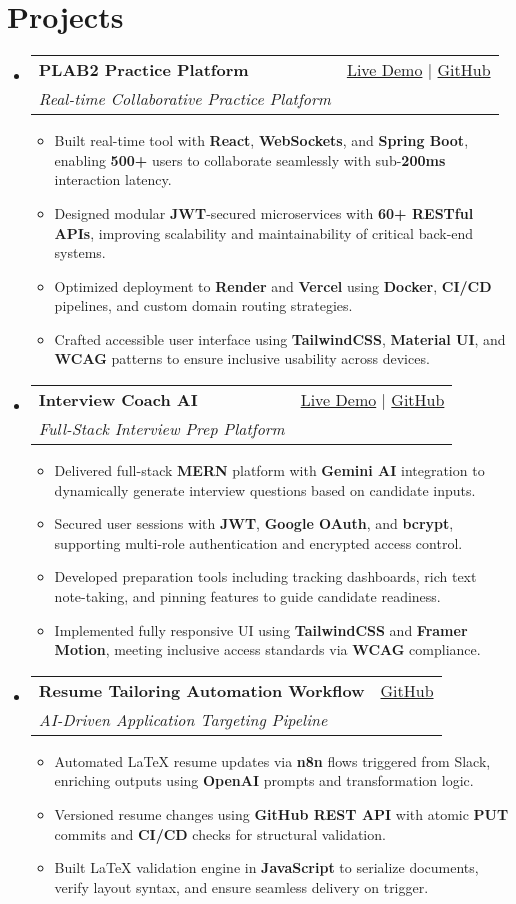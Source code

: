 \documentclass[letterpaper,11pt]{article}
\makeatletter
\newcommand{\resumeItem}[1]{\item\small{#1 \vspace{-2pt}}}
\newcommand{\resumeSubheading}[4]{
  \vspace{-1pt}\item
    \begin{tabular*}{0.97\textwidth}[t]{l@{\extracolsep{\fill}}r}
      \textbf{#1} & #2 \\
      \textit{\small#3} & \textit{\small #4} \\
    \end{tabular*}\vspace{-5pt}
}
\newcommand{\resumeSubHeadingListStart}{\begin{itemize}[leftmargin=*]}
\newcommand{\resumeSubHeadingListEnd}{\end{itemize}}
\newcommand{\resumeItemListStart}{\begin{itemize}}
\newcommand{\resumeItemListEnd}{\end{itemize}\vspace{-5pt}}
\makeatother
\begin{document}
\section{Projects}
  \resumeSubHeadingListStart
    \resumeSubheading
      {\textbf{PLAB2 Practice Platform}}{\href{https://plab2practice.com}{Live Demo} | \href{https://github.com/altansaid/plab2projectnew}{GitHub}}
      {Real-time Collaborative Practice Platform}{}
      \resumeItemListStart
        \resumeItem{Built real-time tool with \textbf{React}, \textbf{WebSockets}, and \textbf{Spring Boot}, enabling \textbf{500+} users to collaborate seamlessly with sub-\textbf{200ms} interaction latency.}
        \resumeItem{Designed modular \textbf{JWT}-secured microservices with \textbf{60+ RESTful APIs}, improving scalability and maintainability of critical back-end systems.}
        \resumeItem{Optimized deployment to \textbf{Render} and \textbf{Vercel} using \textbf{Docker}, \textbf{CI/CD} pipelines, and custom domain routing strategies.}
        \resumeItem{Crafted accessible user interface using \textbf{TailwindCSS}, \textbf{Material UI}, and \textbf{WCAG} patterns to ensure inclusive usability across devices.}
      \resumeItemListEnd

    \resumeSubheading
      {\textbf{Interview Coach AI}}{\href{https://interviewcoach-ai.vercel.app}{Live Demo} | \href{https://github.com/altansaid/interviewcoach-ai}{GitHub}}
      {Full-Stack Interview Prep Platform}{}
      \resumeItemListStart
        \resumeItem{Delivered full-stack \textbf{MERN} platform with \textbf{Gemini AI} integration to dynamically generate interview questions based on candidate inputs.}
        \resumeItem{Secured user sessions with \textbf{JWT}, \textbf{Google OAuth}, and \textbf{bcrypt}, supporting multi-role authentication and encrypted access control.}
        \resumeItem{Developed preparation tools including tracking dashboards, rich text note-taking, and pinning features to guide candidate readiness.}
        \resumeItem{Implemented fully responsive UI using \textbf{TailwindCSS} and \textbf{Framer Motion}, meeting inclusive access standards via \textbf{WCAG} compliance.}
      \resumeItemListEnd

    \resumeSubheading
      {\textbf{Resume Tailoring Automation Workflow}}{\href{https://github.com/altansaid/resume-updates}{GitHub}}
      {AI-Driven Application Targeting Pipeline}{}
      \resumeItemListStart
        \resumeItem{Automated LaTeX resume updates via \textbf{n8n} flows triggered from Slack, enriching outputs using \textbf{OpenAI} prompts and transformation logic.}
        \resumeItem{Versioned resume changes using \textbf{GitHub REST API} with atomic \textbf{PUT} commits and \textbf{CI/CD} checks for structural validation.}
        \resumeItem{Built LaTeX validation engine in \textbf{JavaScript} to serialize documents, verify layout syntax, and ensure seamless delivery on trigger.}
      \resumeItemListEnd
  \resumeSubHeadingListEnd
\end{document}
